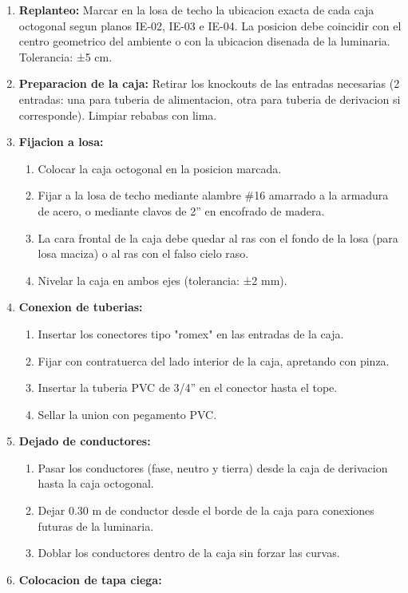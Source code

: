 \begin{enumerate}
  \item \textbf{Replanteo:} Marcar en la losa de techo la ubicacion exacta de cada caja octogonal segun planos IE-02, IE-03 e IE-04. La posicion debe coincidir con el centro geometrico del ambiente o con la ubicacion disenada de la luminaria. Tolerancia: ±5 cm.
  \item \textbf{Preparacion de la caja:} Retirar los knockouts de las entradas necesarias (2 entradas: una para tuberia de alimentacion, otra para tuberia de derivacion si corresponde). Limpiar rebabas con lima.
  \item \textbf{Fijacion a losa:}
  \begin{enumerate}
    \item Colocar la caja octogonal en la posicion marcada.
    \item Fijar a la losa de techo mediante alambre \#16 amarrado a la armadura de acero, o mediante clavos de 2'' en encofrado de madera.
    \item La cara frontal de la caja debe quedar al ras con el fondo de la losa (para losa maciza) o al ras con el falso cielo raso.
    \item Nivelar la caja en ambos ejes (tolerancia: ±2 mm).
  \end{enumerate}
  \item \textbf{Conexion de tuberias:}
  \begin{enumerate}
    \item Insertar los conectores tipo "romex" en las entradas de la caja.
    \item Fijar con contratuerca del lado interior de la caja, apretando con pinza.
    \item Insertar la tuberia PVC de 3/4'' en el conector hasta el tope.
    \item Sellar la union con pegamento PVC.
  \end{enumerate}
  \item \textbf{Dejado de conductores:}
  \begin{enumerate}
    \item Pasar los conductores (fase, neutro y tierra) desde la caja de derivacion hasta la caja octogonal.
    \item Dejar 0.30 m de conductor desde el borde de la caja para conexiones futuras de la luminaria.
    \item Doblar los conductores dentro de la caja sin forzar las curvas.
  \end{enumerate}
  \item \textbf{Colocacion de tapa ciega:}

\end{enumerate}
